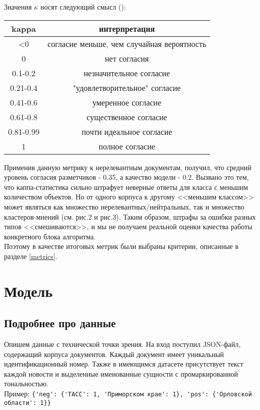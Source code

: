\documentclass{article}
\begin{document}
Значения $\kappa$ носят следующий смысл (\cite{litlink11}):
\begin{table}[!htb]
\center
\begin{tabular}{|c|c|}
\hline
kappa        & интерпретация                              \\ \hline
\textless{}0 & согласие меньше, чем случайная вероятность \\ \hline
0            & нет согласия                               \\ \hline
0.1-0.2      & незначительное согласие                    \\ \hline
0.21-0.4     & "удовлетворительное" согласие              \\ \hline
0.41-0.6     & умеренное согласие                         \\ \hline
0.61-0.8     & существенное согласие                      \\ \hline
0.81-0.99    & почти идеальное согласие                   \\ \hline
1            & полное согласие                            \\ \hline
\end{tabular}
\end{table}
\newline
Применив данную метрику к нерелевантным документам, получил, что средний уровень согласия разметчиков - 0.35, а качество модели - 0.2. Вызвано это тем, что каппа-статистика сильно штрафует неверные ответы для класса с меньшим количеством объектов. Но от одного корпуса к другому <<меньшим классом>> может являться как множество нерелевантных/нейтральных, так и множество кластеров-мнений (см. рис.2 и рис.3). Таким образом, штрафы за ошибки разных типов <<смешиваются>>, и мы не получаем реальной оценки качества работы конкретного блока алгоритма. \\

Поэтому в качестве итоговых метрик были выбраны критерии, описанные в разделе \textcolor{cyan}{\ref{metrics}}.

\section{Модель}
\label{sentiment}
\subsection{Подробнее про данные}
Опишем данные с технической точки зрения. На вход поступил JSON-файл, содержащий корпуса документов. Каждый документ имеет уникальный идентификационный номер. Также в имеющимся датасете присутствует текст каждой новости и выделенные именованные сущности с промаркированной тональностью.\\
Пример:  \verb|{'neg': {'ТАСС': 1, 'Приморском крае': 1}, 'pos': {'Орловской области': 1}}|\\
\end{document}
